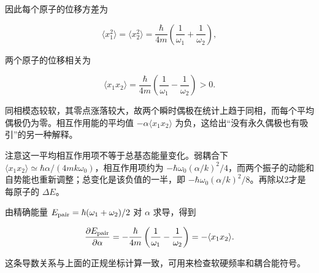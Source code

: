 \documentclass[12pt,a4paper,UTF8]{ctexart}
\begin{document}
因此每个原子的位移方差为

\[
\langle x_1^2\rangle=\langle x_2^2\rangle
=\frac{\hbar}{4m}\left(\frac1{\omega_1}+\frac1{\omega_2}\right),
\]

两个原子的位移相关为

\[
\langle x_1x_2\rangle
=\frac{\hbar}{4m}\left(\frac1{\omega_1}-\frac1{\omega_2}\right)>0.
\]

同相模态较软，其零点涨落较大，故两个瞬时偶极在统计上趋于同相，而每个平均偶极仍为零。相互作用能的平均值
\(-\alpha\langle x_1x_2\rangle\)
为负，这给出``没有永久偶极也有吸引''的另一种解释。

注意这一平均相互作用项不等于总基态能量变化。弱耦合下
\(\langle x_1x_2\rangle\simeq\hbar\alpha/(4mk\omega_0)\)，相互作用项约为
\(-\hbar\omega_0(\alpha/k)^2/4\)，而两个振子的动能和自势能也重新调整；总变化是该负值的一半，即
\(-\hbar\omega_0(\alpha/k)^2/8\)。再除以2才是每原子的 \(\Delta E\)。

由精确能量 \(E_{\rm pair}=\hbar(\omega_1+\omega_2)/2\) 对 \(\alpha\)
求导，得到

\[
\frac{\partial E_{\rm pair}}{\partial\alpha}
=-\frac{\hbar}{4m}\left(\frac1{\omega_1}-\frac1{\omega_2}\right)
=-\langle x_1x_2\rangle.
\]

这条导数关系与上面的正规坐标计算一致，可用来检查软硬频率和耦合能符号。
\end{document}
